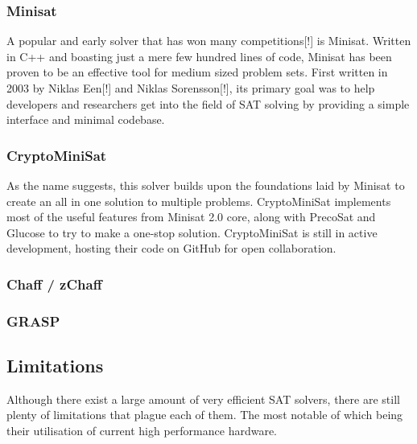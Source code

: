 \documentclass{article}
\begin{document}
\subsubsection{Minisat}
A popular and early solver that has won many competitions[!] is Minisat. Written in C++ and boasting
just a mere few hundred lines of code, Minisat has been proven to be an effective tool for medium
sized problem sets. First written in 2003 by Niklas Een[!] and Niklas Sorensson[!], its primary goal
was to help developers and researchers get into the field of SAT solving by providing a simple
interface and minimal codebase.


\subsubsection{CryptoMiniSat}
As the name suggests, this solver builds upon the foundations laid by Minisat to create an all in
one solution to multiple problems. CryptoMiniSat implements most of the useful features from Minisat
2.0 core, along with PrecoSat and Glucose to try to make a one-stop solution. CryptoMiniSat is still
in active development, hosting their code on GitHub for open collaboration.

\subsubsection{Chaff / zChaff}
\lipsum[2-3]
\subsubsection{GRASP}
\lipsum[2-3]

\subsection{Limitations}
Although there exist a large amount of very efficient SAT solvers, there are still plenty of limitations that plague each of them.
The most notable of which being their utilisation of current high performance hardware.
\end{document}
